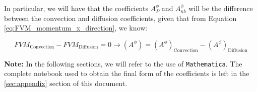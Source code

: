 In particular, we will have that the coefficients $A_P^\phi$ and $A_{nb}^\phi$ will be the difference between the convection and diffusion coefficients, given that from Equation \ref{eq:FVM_momentum_x_direction}, we know:

\begin{equation}
    FVM_{\text{Convection}} - FVM_{\text{Diffusion}} = 0 \rightarrow (A^\phi) = (A^\phi)_{\text{Convection}} - (A^\phi)_{\text{Diffusion}}
\end{equation}

\textbf{Note:} In the following sections, we will refer to the use of \texttt{Mathematica}.
The complete notebook used to obtain the final form of the coefficients is left in the \ref{sec:appendix} section of this document.




